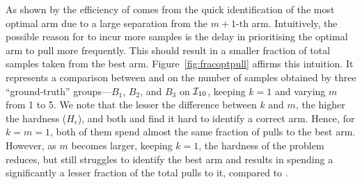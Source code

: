 % 

As shown by \citet{Jamieson+N:2014} the efficiency of \LUCB comes from the quick identification of the most 
optimal arm due to a large separation from the $m+1$-th arm.
Intuitively, the possible reason for \FF to incur more samples is the delay in prioritising the 
optimal arm to pull more frequently. This should result in a smaller fraction of total samples taken from the best 
arm. Figure~\ref{fig:fracoptpull} affirms this intuition. It represents a comparison between \FF and \GLUCB on the number of samples obtained by
three ``ground-truth'' groups---$B_1$, $B_2$, and $B_3$
on $\mathcal{I}_{10}$, keeping $k=1$ and varying $m$ from 1 to 5. We note that
the lesser the difference between $k$ and $m$, the higher the hardness ($H_\epsilon$), and
both \FF and \GLUCB find it hard to identify a correct arm. Hence, for $k = m =1$, both of them
spend almost the same fraction of pulls to the best arm.
However, as $m$ becomes larger, keeping $k=1$, the hardness of the problem reduces, but
\FF still struggles to identify the best arm and results in spending a significantly
a lesser fraction of the total pulls to it, compared to \GLUCB. 

